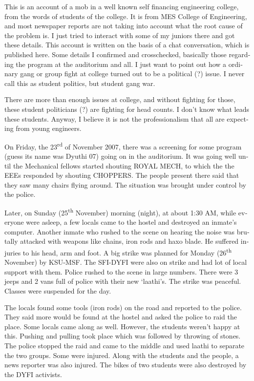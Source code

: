 \vskip 2pt
\begin{english}
This is an account of a mob in a well known self financing engineering college, from the words of students of the college. It is from MES College of Engineering, and most newspaper reports are not taking into account what the root cause of the problem is. I just tried to interact with some of my juniors there and got these details. This account is written on the basis of a chat conversation, which is published here. Some details I confirmed and crosschecked, basically those regarding the program at the auditorium and all. I just want to point out how a ordinary gang or group fight at college turned out to be a political (?) issue. I never call this as student politics, but student gang war.

There are more than enough issues at college, and without fighting for those, these student politicians (?) are fighting for head counts. I don’t know what leads these students. Anyway, I believe it is not the professionalism that all are expecting from young engineers.

On Friday, the 23\textsuperscript{rd} of November 2007, there was a screening for some program (guess its name was Dyuthi 07) going on in the auditorium. It was going well until the Mechanical fellows started shouting ROYAL MECH, to which the the EEEs responded by shouting CHOPPERS. The people present there said that they saw many chairs flying around. The situation was brought under control by the police.

Later, on Sunday (25\textsuperscript{th} November) morning (night), at about 1:30 AM, while everyone were asleep, a few locals came to the hostel and destroyed an inmate’s computer. Another inmate who rushed to the scene on hearing the noise was brutally attacked with weapons like chains, iron rods and haxo blade. He suffered injuries to his head, arm and foot.
A big strike was planned for Monday (26\textsuperscript{th} November) by KSU-MSF. The SFI-DYFI were also on strike and had lot of local support with them. Police rushed to the scene in large numbers. There were 3 jeeps and 2 vans full of police with their new ‘laathi’s. The strike was peaceful. Classes were suspended for the day.

The locals found some tools (iron rods) on the road and reported to the police. They said more would be found at the hostel and asked the police to raid the place. Some locals came along as well. However, the students weren't happy at this. Pushing and pulling took place which was followed by throwing of stones. The police stopped the raid and came to the middle and used laathi to separate the two groups. Some were injured.
Along with the students and the people, a news reporter was also injured. The bikes of two students were also destroyed by the DYFI activists.


\end{english}
